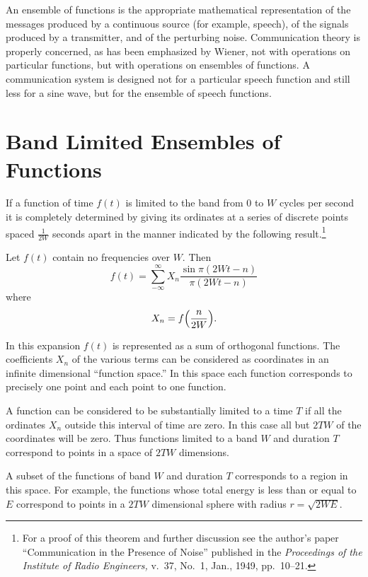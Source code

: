 An ensemble of functions is the appropriate mathematical representation of
the messages produced by a continuous source (for example, speech), of
the signals produced by a transmitter, and of the perturbing noise.
Communication theory is properly concerned, as has been emphasized by
Wiener, not with operations on particular functions, but with operations on
ensembles of functions.  A communication system is designed not for a
particular speech function and still less for a sine wave, but for the
ensemble of speech functions.

\section{Band Limited Ensembles of Functions}

If a function of time $f(t)$ is limited to the band from $0$ to $W$ cycles
per second it is completely determined by giving its ordinates at a series of
discrete points spaced $\frac1{2W}$ seconds apart in the manner
indicated by the following result.\footnote{For a proof of this theorem and
further discussion see the author's paper ``Communication in the Presence of
Noise'' published in the {\it Proceedings of the Institute of Radio Engineers,}
v.~37, No.~1, Jan., 1949, pp.~10--21.}

\begin{theorem}
\label{thm:13}
Let $f(t)$ contain no frequencies over $W$.  Then
$$
f(t)=\sum_{-\infty}^\infty X_n\frac{\sin\pi(2Wt-n)}{\pi(2Wt-n)}
$$
where
$$
X_n=f\Bigl(\frac{n}{2W}\Bigr).
$$
\end{theorem}

In this expansion $f(t)$ is represented as a sum of orthogonal
functions.  The coefficients $X_n$ of the various terms can be
considered as coordinates in an infinite dimensional  ``function space.''
In this space each function corresponds to precisely one point and each
point to one function.

A function can be considered to be substantially limited to a time $T$
if all the ordinates $X_n$ outside this interval of time are zero.  In
this case all but $2T W$ of the coordinates will be zero.  Thus
functions limited to a band $W$ and duration $T$ correspond to points
in a space of $2T W$ dimensions.

A subset of the functions of band $W$ and duration $T$ corresponds to a
region in this space.  For example, the functions whose total energy is
less than or equal to $E$ correspond to points in a $2T W$ dimensional
sphere with radius $r=\sqrt{2W E}$.

